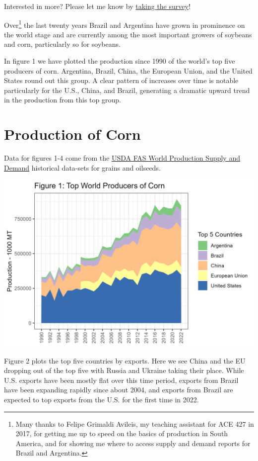 \documentclass[
  letterpaper,
  DIV=11,
  numbers=noendperiod]{scrreprt}
\begin{document}
{Interested in more? Please let me know by}
\href{https://forms.gle/Q3VByCQZHjfQSy9D7}{taking the survey}!

Over\footnote{Many thanks to Felipe Grimaldi Avileis, my teaching
  assistant for ACE 427 in 2017, for getting me up to speed on the
  basics of production in South America, and for showing me where to
  access supply and demand reports for Brazil and Argentina.} the last
twenty years Brazil and Argentina have grown in prominence on the world
stage and are currently among the most important growers of soybeans and
corn, particularly so for soybeans.

In figure 1 we have plotted the production since 1990 of the world's top
five producers of corn. Argentina, Brazil, China, the European Union,
and the United States round out this group. A clear pattern of increases
over time is notable particularly for the U.S., China, and Brazil,
generating a dramatic upward trend in the production from this top
group.

\hypertarget{production-of-corn}{%
\section{Production of Corn}\label{production-of-corn}}

Data for figures 1-4 come from the
\href{https://apps.fas.usda.gov/psdonline/app/index.html\#/app/downloads}{USDA
FAS World Production Supply and Demand} historical data-sets for grains
and oilseeds.

\includegraphics{assets/SouthAmericanProduction_TopProdCorn.png}

Figure 2 plots the top five countries by exports. Here we see China and
the EU dropping out of the top five with Russia and Ukraine taking their
place. While U.S. exports have been mostly flat over this time period,
exports from Brazil have been expanding rapidly since about 2004, and
exports from Brazil are expected to top exports from the U.S. for the
first time in 2022.
\end{document}
